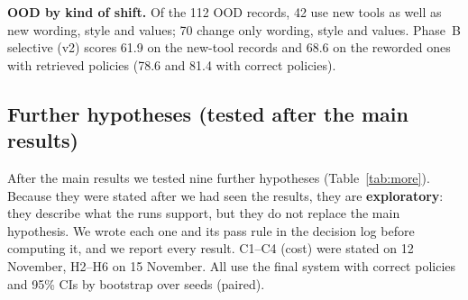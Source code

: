 \documentclass[10pt]{article}
\begin{document}
\textbf{OOD by kind of shift.} Of the 112 OOD records, 42 use new tools as well as new wording, style and
values; 70 change only wording, style and values. Phase~B selective (v2) scores 61.9 on the new-tool records
and 68.6 on the reworded ones with retrieved policies (78.6 and 81.4 with correct policies).

\subsection{Further hypotheses (tested after the main results)}\label{sec:more}
After the main results we tested nine further hypotheses (Table~\ref{tab:more}). Because they were stated
after we had seen the results, they are \textbf{exploratory}: they describe what the runs support, but they
do not replace the main hypothesis. We wrote each one and its pass rule in the decision log before computing
it, and we report every result. C1--C4 (cost) were stated on 12 November, H2--H6 on 15 November. All use the
final system with correct policies and 95\% CIs by bootstrap over seeds (paired).
\end{document}
